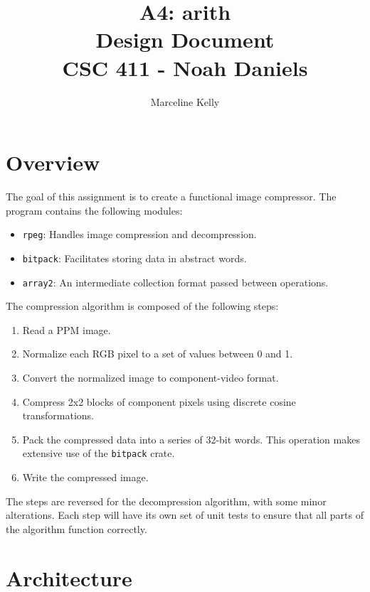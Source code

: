 \documentclass[12pt, letterpaper]{article}
\title{A4: arith \\
\large Design Document \\
CSC 411 - Noah Daniels}
\author{Marceline Kelly}
\begin{document}
    \maketitle

    \tableofcontents


    \section{Overview}

    The goal of this assignment is to create a functional image compressor.
    The program contains the following modules:

    \begin{itemize}
        \item \verb|rpeg|: Handles image compression and decompression.
        \item \verb|bitpack|: Facilitates storing data in abstract words.
        \item \verb|array2|: An intermediate collection format passed between operations.
    \end{itemize}

    The compression algorithm is composed of the following steps:

    \begin{enumerate}
        \item Read a PPM image.
        \item Normalize each RGB pixel to a set of values between 0 and 1.
        \item Convert the normalized image to component-video format.
        \item Compress 2x2 blocks of component pixels using discrete cosine transformations.
        \item Pack the compressed data into a series of 32-bit words.
        \subitem This operation makes extensive use of the \verb|bitpack| crate.
        \item Write the compressed image.
    \end{enumerate}

    The steps are reversed for the decompression algorithm, with some minor alterations.
    Each step will have its own set of unit tests to ensure that all parts of the algorithm function correctly.


    \section{Architecture}
\end{document}
